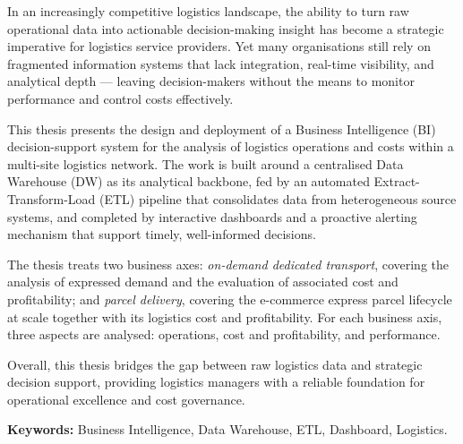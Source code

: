 
In an increasingly competitive logistics landscape, the ability to turn raw operational data
into actionable decision-making insight has become a strategic imperative for logistics service
providers. Yet many organisations still rely on fragmented information systems that lack
integration, real-time visibility, and analytical depth --- leaving decision-makers without the
means to monitor performance and control costs effectively.

This thesis presents the design and deployment of a Business Intelligence (BI) decision-support
system for the analysis of logistics operations and costs within a multi-site logistics network.
The work is built around a centralised Data Warehouse (DW) as its analytical backbone, fed by an
automated Extract-Transform-Load (ETL) pipeline that consolidates data from heterogeneous source
systems, and completed by interactive dashboards and a proactive alerting mechanism that support
timely, well-informed decisions.

The thesis treats two business axes: \emph{on-demand dedicated transport}, covering the analysis
of expressed demand and the evaluation of associated cost and profitability; and \emph{parcel
delivery}, covering the e-commerce express parcel lifecycle at scale together with its logistics
cost and profitability. For each business axis, three aspects are analysed: operations, cost and
profitability, and performance.

Overall, this thesis bridges the gap between raw logistics data and strategic decision support,
providing logistics managers with a reliable foundation for operational excellence and cost
governance.

\bigskip
\vspace{0.5cm}

\noindent\textbf{Keywords:} Business Intelligence, Data Warehouse, ETL, Dashboard, Logistics.
